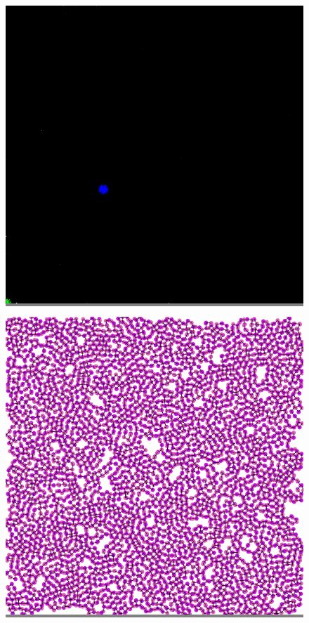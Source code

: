 \documentclass{article}
\begin{document}
\begin{figure}
\begin{minipage}{0.3\textwidth}
    \end{minipage}
    \vskip 0.1in
    \begin{minipage}{0.3\textwidth}
    \colorbox{gray}{\includegraphics[width=\linewidth]{./images/square_6.png}}
    \end{minipage}
    \hspace{\fill}
    \begin{minipage}{0.3\textwidth}
    \colorbox{gray}{\includegraphics[width=\linewidth]{./images/square_6_bb_0.png}}

\end{minipage}
\end{figure}
\end{document}
